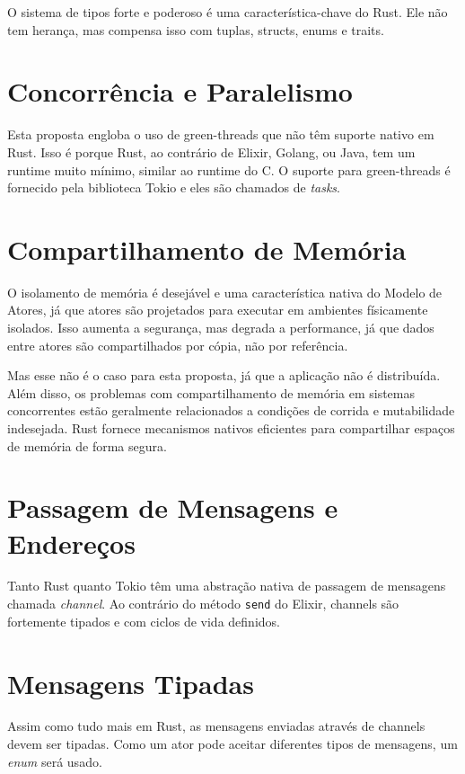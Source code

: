 O sistema de tipos forte e poderoso é uma característica-chave do Rust. Ele não tem herança, mas compensa isso com tuplas, structs, enums e traits.

\section{Concorrência e Paralelismo}

Esta proposta engloba o uso de green-threads que não têm suporte nativo em Rust. Isso é porque Rust, ao contrário de Elixir, Golang, ou Java, tem um runtime muito mínimo, similar ao runtime do C. O suporte para green-threads é fornecido pela biblioteca Tokio e eles são chamados de \emph{tasks}.

\section{Compartilhamento de Memória}

O isolamento de memória é desejável e uma característica nativa do Modelo de Atores, já que atores são projetados para executar em ambientes físicamente isolados. Isso aumenta a segurança, mas degrada a performance, já que dados entre atores são compartilhados por cópia, não por referência.

Mas esse não é o caso para esta proposta, já que a aplicação não é distribuída. Além disso, os problemas com compartilhamento de memória em sistemas concorrentes estão geralmente relacionados a condições de corrida e mutabilidade indesejada. Rust fornece mecanismos nativos eficientes para compartilhar espaços de memória de forma segura.

\section{Passagem de Mensagens e Endereços}

Tanto Rust quanto Tokio têm uma abstração nativa de passagem de mensagens chamada \emph{channel}. Ao contrário do método \texttt{send} do Elixir, channels são fortemente tipados e com ciclos de vida definidos.

\section{Mensagens Tipadas}

Assim como tudo mais em Rust, as mensagens enviadas através de channels devem ser tipadas. Como um ator pode aceitar diferentes tipos de mensagens, um \emph{enum} será usado.

